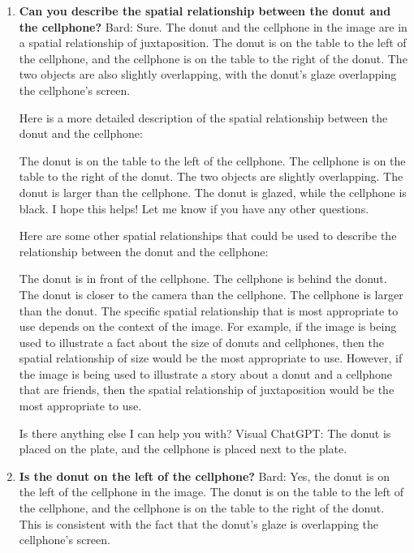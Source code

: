    \begin{enumerate}
        \item \textbf{Can you describe the spatial relationship between the donut and the cellphone?}
        \subitem Bard: Sure. The donut and the cellphone in the image are in a spatial relationship of juxtaposition. The donut is on the table to the left of the cellphone, and the cellphone is on the table to the right of the donut. The two objects are also slightly overlapping, with the donut's glaze overlapping the cellphone's screen.

        Here is a more detailed description of the spatial relationship between the donut and the cellphone:
        
        The donut is on the table to the left of the cellphone.
        The cellphone is on the table to the right of the donut.
        The two objects are slightly overlapping.
        The donut is larger than the cellphone.
        The donut is glazed, while the cellphone is black.
        I hope this helps! Let me know if you have any other questions.
        
        Here are some other spatial relationships that could be used to describe the relationship between the donut and the cellphone:
        
        The donut is in front of the cellphone.
        The cellphone is behind the donut.
        The donut is closer to the camera than the cellphone.
        The cellphone is larger than the donut.
        The specific spatial relationship that is most appropriate to use depends on the context of the image. For example, if the image is being used to illustrate a fact about the size of donuts and cellphones, then the spatial relationship of size would be the most appropriate to use. However, if the image is being used to illustrate a story about a donut and a cellphone that are friends, then the spatial relationship of juxtaposition would be the most appropriate to use.
        
        Is there anything else I can help you with?
        \subitem Visual ChatGPT: The donut is placed on the plate, and the cellphone is placed next to the plate.
        \item \textbf{Is the donut on the left of the cellphone?}
        \subitem Bard: 
        Yes, the donut is on the left of the cellphone in the image. The donut is on the table to the left of the cellphone, and the cellphone is on the table to the right of the donut. This is consistent with the fact that the donut's glaze is overlapping the cellphone's screen.
        

\end{enumerate}
